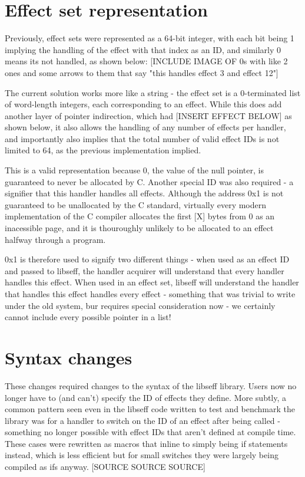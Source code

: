 \documentclass[logo,bsc,singlespacing,parskip,online]{infthesis}
\begin{document}
\section{Effect set representation}

Previously, effect sets were represented as a 64-bit integer, with each bit being 1 implying the handling of the effect with that index as an ID, and similarly 0 means its not handled, as shown below: [INCLUDE IMAGE OF 0s with like 2 ones and some arrows to them that say "this handles effect 3 and effect 12"]

The current solution works more like a string - the effect set is a 0-terminated list of word-length integers, each corresponding to an effect. While this does add another layer of pointer indirection, which had [INSERT EFFECT BELOW] as shown below, it also allows the handling of any number of effects per handler, and importantly also implies that the total number of valid effect IDs is not limited to 64, as the previous implementation implied.

This is a valid representation because 0, the value of the null pointer, is guaranteed to never be allocated by C. Another special ID was also required - a signifier that this handler handles all effects. Although the address 0x1 is not guaranteed to be unallocated by the C standard, virtually every modern implementation of the C compiler allocates the first [X] bytes from 0 as an inacessible page, and it is thouroughly unlikely to be allocated to an effect halfway through a program.

0x1 is therefore used to signify two different things - when used as an effect ID and passed to libseff, the handler acquirer will understand that every handler handles this effect. When used in an effect set, libseff will understand the handler that handles this effect handles every effect - something that was trivial to write under the old system, bur requires special consideration now - we certainly cannot include every possible pointer in a list!

\section{Syntax changes}

These changes required changes to the syntax of the libseff library. Users now no longer have to (and can't) specify the ID of effects they define. More subtly, a common pattern seen even in the libseff code written to test and benchmark the library was for a handler to switch on the ID of an effect after being called - something no longer possible with effect IDs that aren't defined at compile time. These cases were rewritten as macros that inline to simply being if statements instead, which is less efficient but for small switches they were largely being compiled as ifs anyway. [SOURCE SOURCE SOURCE]
\end{document}
